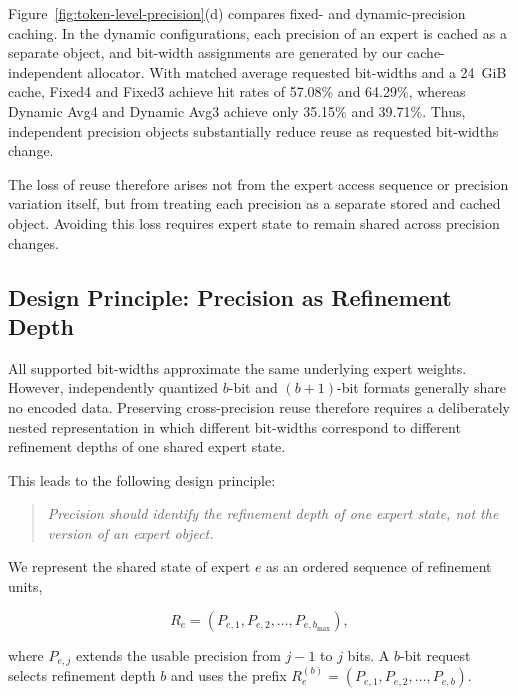 \documentclass[sigconf, nonacm]{acmart}
\begin{document}
Figure~\ref{fig:token-level-precision}(d) compares fixed- and
dynamic-precision caching. In the dynamic
configurations, each precision of an expert is cached as a separate object, and bit-width assignments are generated by our cache-independent
allocator. With matched average requested bit-widths and a 24~GiB cache,
Fixed4 and Fixed3 achieve hit rates of 57.08\% and 64.29\%, whereas
Dynamic Avg4 and Dynamic Avg3 achieve only 35.15\% and 39.71\%.
Thus, independent precision objects substantially reduce reuse as
requested bit-widths change.

The loss of reuse therefore arises not from the expert access sequence
or precision variation itself, but from treating each precision as a
separate stored and cached object. Avoiding this loss requires expert
state to remain shared across precision changes.

\subsection{Design Principle: Precision as Refinement Depth}
\label{sec:progressive-abstraction}

All supported bit-widths approximate the same underlying expert
weights. However, independently quantized \(b\)-bit and
\((b+1)\)-bit formats generally share no encoded data. Preserving
cross-precision reuse therefore requires a deliberately nested
representation in which different bit-widths correspond to different
refinement depths of one shared expert state.

This leads to the following design principle:

\begin{quote}
\emph{Precision should identify the refinement depth of one expert
state, not the version of an expert object.}
\end{quote}

We represent the shared state of expert \(e\) as an ordered sequence of
refinement units,

\begin{equation}
    R_e =
    \left(
        P_{e,1},
        P_{e,2},
        \ldots,
        P_{e,b_{\max}}
    \right),
\end{equation}

where \(P_{e,j}\) extends the usable precision from \(j-1\) to \(j\)
bits. A \(b\)-bit request selects refinement depth \(b\) and uses the
prefix
\(
    R_e^{(b)} =
    \left(
        P_{e,1},
        P_{e,2},
        \ldots,
        P_{e,b}
    \right).
\)
\end{document}
